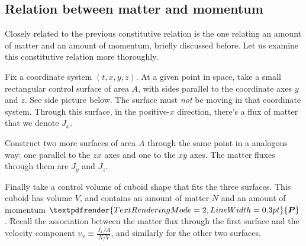 \documentclass[a4paper,12pt,%
onecolumn,oneside,titlepage,%
british%
]{memoir}
\renewcommand*{\bm}[1]{\textpdfrender{TextRenderingMode=2,LineWidth=0.3pt}{\boldsymbol{#1}}}
\renewcommand*{\|}[1][]{\nonscript\:#1\vert\nonscript\:\mathopen{}}
\newcommand*{\sect}{\S}%
\newcommand*{\yv}{\bm{v}}
\newcommand*{\yN}{N}
\newcommand*{\yJ}{J}
\newcommand*{\yrho}{\rho}
\newcommand*{\yM}{m}%
\newcommand*{\yP}{\bm{P}}
\begin{document}
\subsection{Relation between matter and momentum}
\label{nsec:const_matter_momentum}

Closely related to the previous constitutive relation is the one {relating an amount of matter and an amount of momentum}, briefly discussed before. Let us examine this constitutive relation more thoroughly.

Fix a coordinate system $(t,x,y,z)$. At a given point in space, take a small rectangular control surface of area $A$, with sides parallel to the coordinate axes $y$ and $z$. See side picture below. The surface must \emph{not} be moving in that coordinate system. Through this surface, in the positive-$x$ direction, there's a flux of matter that we denote $J_{x}$.

Construct two more surfaces of area $A$ through the same point in a analogous way: one parallel to the $zx$ axes and one to the $xy$ axes. The matter fluxes through them are $J_{y}$ and $J_{z}$.

Finally take a control volume of cuboid shape that fits the three surfaces. This cuboid has volume $V$, and contains an amount of matter $\yN$ and an amount of momentum $\yP$. Recall the {association between the matter flux} through the first surface and the velocity component $v_{x} \equiv \frac{J_{x}/A}{\yN/V}$, and similarly for the other two surfaces.

% 
% 
\end{document}
